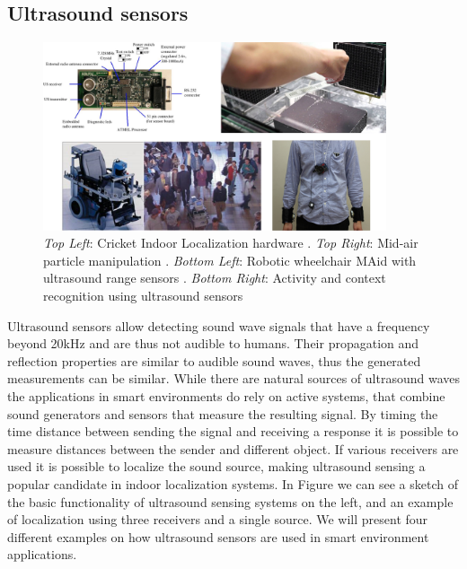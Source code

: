 \subsection{Ultrasound sensors}
\begin{figure}[h]
\centering
\includegraphics[width=0.9\textwidth]{images/rel_tech_ultra}
\caption{\emph{Top Left}: Cricket Indoor Localization hardware \cite{priyantha2000cricket}. \emph{Top Right}: Mid-air particle manipulation \cite{ochiai2013three}. \emph{Bottom Left}: Robotic wheelchair MAid with ultrasound range sensors \cite{prassler2001robotics}. \emph{Bottom Right}: Activity and context recognition using ultrasound sensors \cite{watanabe2013ultrasound}}
\label{fig:rel_tech_ultra}
\end{figure}
Ultrasound sensors allow detecting sound wave signals that have a frequency beyond 20kHz and are thus not audible to humans. Their propagation and reflection properties are similar to audible sound waves, thus the generated measurements can be similar. While there are natural sources of ultrasound waves the applications in smart environments do rely on active systems, that combine sound generators and sensors that measure the resulting signal. By timing the time distance between sending the signal and receiving a response it is possible to measure distances between the sender and different object.  If various receivers are used it is possible to localize the sound source, making ultrasound sensing a popular candidate in indoor localization systems. In Figure we can see a sketch of the basic functionality of ultrasound sensing systems on the left, and an example of localization using three receivers and a single source. We will present four different examples on how ultrasound sensors are used in smart environment applications.

